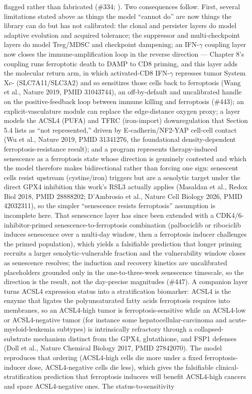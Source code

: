 \documentclass[11pt,twoside,openright]{report}
\begin{document}
flagged rather than fabricated (\#334; ). Two consequences follow. First, several limitations stated above as things the model ``cannot do'' are now things the library can do but has not calibrated: the clonal and persister layers do model adaptive evolution and acquired tolerance; the suppressor and multi-checkpoint layers do model Treg/MDSC and checkpoint dampening; an IFN-$\gamma$ coupling layer now closes the immune-amplification loop in the reverse direction --- Chapter 8's coupling runs ferroptotic death to DAMP to CD8 priming, and this layer adds the molecular return arm, in which activated-CD8 IFN-$\gamma$ represses tumor System Xc- (SLC7A11/SLC3A2) and so sensitizes those cells back to ferroptosis (Wang et al., Nature 2019, PMID 31043744), an off-by-default and uncalibrated handle on the positive-feedback loop between immune killing and ferroptosis (\#443); an explicit-vasculature module can replace the edge-distance oxygen proxy; a  layer models the ACSL4 (PUFA) and TFRC (iron-import) downregulation that Section 5.4 lists as ``not represented,'' driven by E-cadherin/NF2-YAP cell-cell contact (Wu et al., Nature 2019, PMID 31341276, the foundational density-dependent ferroptosis-resistance result); and a  program represents therapy-induced senescence as a ferroptosis state whose direction is genuinely contested and which the model therefore makes bidirectional rather than forcing one sign: senescent cells resist upstream (cystine/iron) triggers but are a senolytic target under the direct GPX4 inhibition this work's RSL3 actually applies (Masaldan et al., Redox Biol 2018, PMID 28888202; D'Ambrosio et al., Nature Cell Biology 2026, PMID 42032311), so the simpler ``senescence resists ferroptosis'' assumption is incomplete here. That senescence layer has since been extended with a CDK4/6-inhibitor-primed senescence-to-ferroptosis combination (palbociclib or ribociclib induces senescence over a multi-day window, then a ferroptosis inducer challenges the primed population), which yields a falsifiable prediction that longer priming recruits a larger senolytic-vulnerable fraction and the vulnerability window closes as senescence resolves; the induction and recovery kinetics are uncalibrated placeholders grounded only in the one-to-three-week senescence timescale, so the direction is the result, not the day-precise magnitudes (\#447). A companion  layer turns ACSL4 expression status into a stratification biomarker: ACSL4 is the enzyme that ligates the polyunsaturated fatty acids ferroptosis requires into membranes, so an ACSL4-high tumor is ferroptosis-sensitive while an ACSL4-low or ACSL4-negative tumor (for instance some hepatocellular-carcinoma and acute-myeloid-leukemia subtypes) is intrinsically refractory through a collapsed-substrate mechanism distinct from the GPX4, glutathione, and FSP1 defenses (Doll et al., Nature Chemical Biology 2017, PMID 27842070). The model reproduces that ordering (ACSL4-high cells die more under a fixed ferroptosis-inducer dose, ACSL4-negative cells die less), which gives the falsifiable clinical-stratification prediction that ferroptosis inducers will benefit ACSL4-high cancers and spare ACSL4-negative ones. The status-to-sensitivity 
\end{document}

